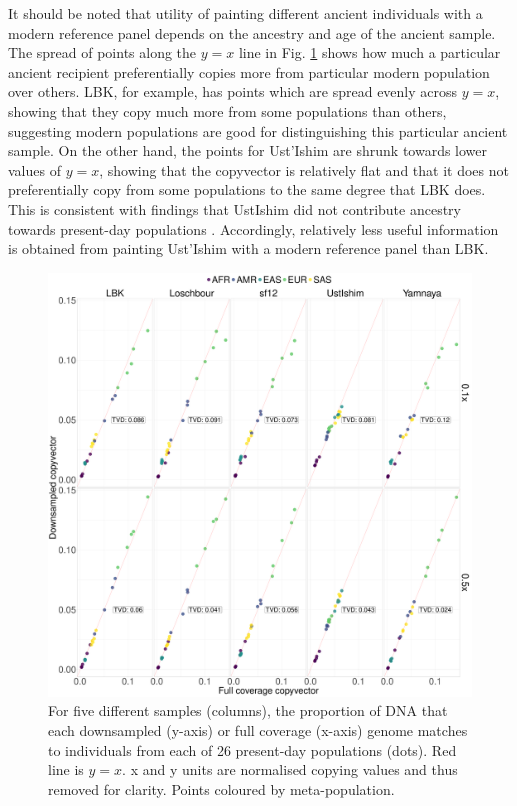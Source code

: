 {It should be noted that utility of painting different ancient individuals with a modern reference panel depends on the ancestry and age of the ancient sample. The spread of points along the $y=x$ line in Fig. \ref{fig:CP_correlation_allSamples_0.1x_0.5x_30x_moderns} shows how much a particular ancient recipient preferentially copies more from particular modern population over others. LBK, for example, has points which are spread evenly across $y=x$, showing that they copy much more from some populations than others, suggesting modern populations are good for distinguishing this particular ancient sample. On the other hand, the points for Ust'Ishim are shrunk towards lower values of $y=x$, showing that the copyvector is relatively flat and that it does not preferentially copy from some populations to the same degree that LBK does. This is consistent with findings that UstIshim did not contribute ancestry towards present-day populations \cite{Fu2014}. Accordingly, relatively less useful information is obtained from painting Ust'Ishim with a modern reference panel than LBK.

\begin{figure}[htp]
    \centering
    \includegraphics[width=1.0\textwidth]{../images/chapter1/CP_correlation_allSamples_0.1x_0.5x_30x_moderns.pdf}
    \caption{For five different samples (columns), the proportion of DNA that each downsampled (y-axis) or full coverage (x-axis) genome matches to individuals from each of 26 present-day populations (dots). Red line is $y=x$. x and y units are normalised copying values and thus removed for clarity. Points coloured by meta-population.}
    \label{fig:CP_correlation_allSamples_0.1x_0.5x_30x_moderns}
\end{figure}

}
